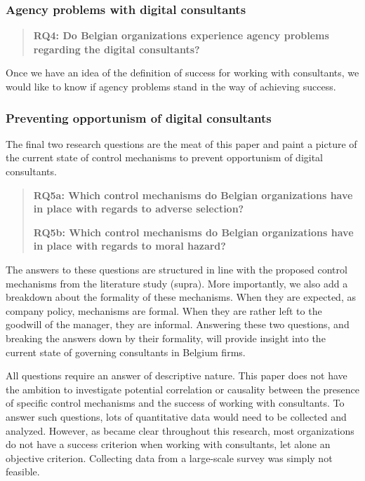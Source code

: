\documentclass[12pt]{article}
\begin{document}
\subsubsection{Agency problems with digital
consultants}\label{agency-problems-with-digital-consultants}

\begin{quote}
\textbf{RQ4: Do Belgian organizations experience agency problems
regarding the digital consultants?}
\end{quote}

Once we have an idea of the definition of success for working with
consultants, we would like to know if agency problems stand in the way
of achieving success.

\subsubsection{Preventing opportunism of digital
consultants}\label{preventing-opportunism-of-digital-consultants}

The final two research questions are the meat of this paper and paint a
picture of the current state of control mechanisms to prevent
opportunism of digital consultants.

\begin{quote}
\textbf{RQ5a: Which control mechanisms do Belgian organizations have in
place with regards to adverse selection?}

\textbf{RQ5b: Which control mechanisms do Belgian organizations have in
place with regards to moral hazard?}
\end{quote}

The answers to these questions are structured in line with the proposed
control mechanisms from the literature study (supra). More importantly,
we also add a breakdown about the formality of these mechanisms. When
they are expected, as company policy, mechanisms are formal. When they
are rather left to the goodwill of the manager, they are informal.
Answering these two questions, and breaking the answers down by their
formality, will provide insight into the current state of governing
consultants in Belgium firms.

All questions require an answer of descriptive nature. This paper does
not have the ambition to investigate potential correlation or causality
between the presence of specific control mechanisms and the success of
working with consultants. To answer such questions, lots of quantitative
data would need to be collected and analyzed. However, as became clear
throughout this research, most organizations do not have a success
criterion when working with consultants, let alone an objective
criterion. Collecting data from a large-scale survey was simply not
feasible.
\end{document}
